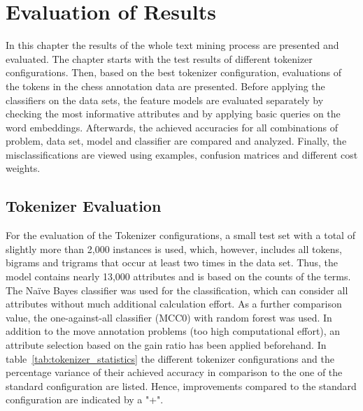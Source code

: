 \documentclass[article,type=msc,colorback,accentcolor=tud7b]{tudthesis}
\begin{document}
  \section{Evaluation of Results}
  \label{sec:evaluation_of_results}
    In this chapter the results of the whole text mining process are presented and evaluated. The chapter starts with the test results of different tokenizer configurations. Then, based on the best tokenizer configuration, evaluations of the tokens in the chess annotation data are presented. Before applying the classifiers on the data sets, the feature models are evaluated separately by checking the most informative attributes and by applying basic queries on the word embeddings. Afterwards, the achieved accuracies for all combinations of problem, data set, model and classifier are compared and analyzed. Finally, the misclassifications are viewed using examples, confusion matrices and different cost weights.
      
  \subsection{Tokenizer Evaluation}    
  \label{subsec:tokenizer_evaluation}
    For the evaluation of the Tokenizer configurations, a small test set with a total of slightly more than 2,000 instances is used, which, however, includes all tokens, bigrams and trigrams that occur at least two times in the data set. Thus, the model contains nearly 13,000 attributes and is based on the counts of the terms. The Naïve Bayes classifier was used for the classification, which can consider all attributes without much additional calculation effort. As a further comparison value, the one-against-all classifier (MCC0) with random forest was used. In addition to the move annotation problems (too high computational effort), an attribute selection based on the gain ratio has been applied beforehand. In table~\ref{tab:tokenizer_statistics} the different tokenizer configurations and the percentage variance of their achieved accuracy in comparison to the one of the standard configuration are listed. Hence, improvements compared to the standard configuration are indicated by a "+".
    
\end{document}
